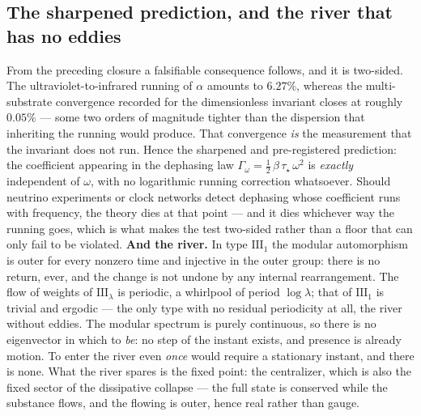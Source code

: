 \documentclass[11pt]{article}
\theoremstyle{definition}\newtheorem{deriv}{Derivation}
\begin{document}
\subsection*{The sharpened prediction, and the river that has no eddies}From the preceding closure a falsifiable consequence follows, and it is two-sided. The ultraviolet-to-infrared running of $\alpha$ amounts to $6.27\%$, whereas the multi-substrate convergence recorded for the dimensionless invariant closes at roughly $0.05\%$ --- some two orders of magnitude tighter than the dispersion that inheriting the running would produce. That convergence \emph{is} the measurement that the invariant does not run. Hence the sharpened and pre-registered prediction: the coefficient appearing in the dephasing law $\Gamma_\omega = \tfrac12\,\beta\,\tau_\star\,\omega^2$ is \emph{exactly} independent of $\omega$, with no logarithmic running correction whatsoever. Should neutrino experiments or clock networks detect dephasing whose coefficient runs with frequency, the theory dies at that point --- and it dies whichever way the running goes, which is what makes the test two-sided rather than a floor that can only fail to be violated. \textbf{And the river.} In type $\mathrm{III}_1$ the modular automorphism is outer for every nonzero time and injective in the outer group: there is no return, ever, and the change is not undone by any internal rearrangement. The flow of weights of $\mathrm{III}_\lambda$ is periodic, a whirlpool of period $\log\lambda$; that of $\mathrm{III}_1$ is trivial and ergodic --- the only type with no residual periodicity at all, the river without eddies. The modular spectrum is purely continuous, so there is no eigenvector in which to \emph{be}: no step of the instant exists, and presence is already motion. To enter the river even \emph{once} would require a stationary instant, and there is none. What the river spares is the fixed point: the centralizer, which is also the fixed sector of the dissipative collapse --- the full state is conserved while the substance flows, and the flowing is outer, hence real rather than gauge.
\end{document}
